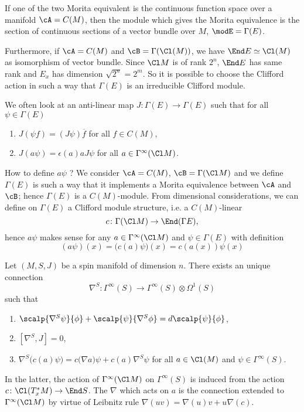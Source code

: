 \begin{theorem}
If one of the two Morita equivalent is the continuous function space over a manifold $\cA=C(M)$, then the module which gives the Morita equivalence is the section of continuous sections of a vector bundle over $M$, $\modE=\Gamma(E)$.
\end{theorem}
Furthermore, if $\cA=C(M)$ and $\cB=\Gamma(\Cl(M))$, we have $\End E\simeq \Cl(M)$ as isomorphism of vector bundle. Since $\Cl M$ is of rank $2^n$, $\End E$ has same rank and $E_x$ has dimension $\sqrt{2^n}=2^m$. So it is possible to choose the Clifford action in such a way that $\Gamma(E)$ is an irreducible Clifford module.

We often look at an anti-linear map $J\colon \Gamma(E)\to \Gamma(E)$ such that for all $\psi\in\Gamma(E)$
\begin{enumerate}
\item $J(\psi f)=(J\psi)\overline{ f }$ for all $f\in C(M)$,
\item $J(a\psi)=\epsilon(a)a J\psi$ for all $a\in\Gamma^{\infty}(\Cl M)$.
\end{enumerate}
How to define $a\psi$ ? We consider $\cA=C(M)$, $\cB=\Gamma(\Cl M)$ and we define $\Gamma(E)$ is such a way that it implements a Morita equivalence between $\cA$ and $\cB$; hence $\Gamma(E)$ is a $C(M)$-module. From dimensional considerations, we can define on $\Gamma(E)$ a Clifford module structure, i.e. a $C(M)$-linear
\begin{equation}
  c\colon \Gamma(\Cl M)\to \End(\Gamma E),
\end{equation}
hence $a\psi$ makes sense for any $a\in\Gamma^{\infty}(\Cl M)$ and $\psi\in\Gamma(E)$ with definition
\begin{equation}
 (a\psi)(x)=\big( c(a)\psi \big)(x)
		=c(a(x))\psi(x)
\end{equation}

\begin{theorem}
Let $(M,S,J)$ be a spin manifold of dimension $n$. There exists an unique connection 
\[ 
  \nabla^S\colon \Gamma^{\infty}(S)\to \Gamma^{\infty}(S)\otimes\Omega^1(S)
\]
such that
\begin{enumerate}
\item $\scalp{ \nabla^S\psi }{ \phi }+\scalp{ \psi }{ \nabla^S\phi }=d\scalp{ \psi }{ \phi }$,
\item $[\nabla^S,J]=0$,
\item $\nabla^S\big( c(a)\psi \big)=c\big( \nabla a \big)\psi+c(a)\nabla^S\psi$ for all $a\in\Cl(M)$ and $\psi\in\Gamma^{\infty}(S)$.
\end{enumerate}
In the latter, the action of $\Gamma^{\infty}(\Cl M)$ on $\Gamma^{\infty}(S)$ is induced from the action $c\colon \Cl(T^*_xM)\to \End S$. The $\nabla$ which acts on $a$ is the connection extended to $\Gamma^{\infty}(\Cl M)$ by virtue of Leibnitz rule $\nabla(uv)=\nabla(u)v+u\nabla(c)$.

\end{theorem}

